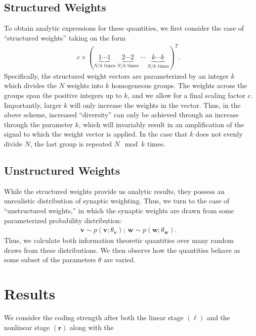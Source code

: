\documentclass[11pt]{article}
\begin{document}
	\subsection{Structured Weights}
	To obtain analytic expressions for these quantities, we first consider the case of ``structured weights'' taking on the form
	\begin{align}
		c \times \left(\underbrace{1 \cdots 1}_{N/k \text{ times}}  \ \underbrace{2 \cdots 2}_{N/k \text{ times}} \ \cdots \ \underbrace{k \cdots k}_{N/k \text{ times}}   \right)^T.
	\end{align}
	Specifically, the structured weight vectors are parameterized by an integer $k$ which divides the $N$ weights into $k$ homogeneous groups. The weights across the groups span the positive integers up to $k$, and we allow for a final scaling factor $c$. Importantly,  larger $k$ will only increase the weights in the vector. Thus, in the above scheme, increased ``diversity'' can only be achieved through an increase through the parameter $k$, which will invariably result in an amplification of the signal to which the weight vector is applied. In the case that $k$ does not evenly divide $N$, the last group is repeated $N\mod k$ times.
	
	\subsection{Unstructured Weights}
	
	While the structured weights provide us analytic results, they possess an unrealistic distribution of synaptic weighting. Thus, we turn to the case of ``unstructured weights,'' in which the synaptic weights are drawn from some parameterized probability distribution:
	\begin{align}
		\mathbf{v} \sim p(\mathbf{v}; \theta_{\mathbf{v}}); \ \mathbf{w} \sim p(\mathbf{w}; \theta_{\mathbf{w}}).
	\end{align}
	Thus, we  calculate both information theoretic quantities over many random draws from these distributions. We then observe how the quantities behave as some subset of the parameters $\theta$ are varied.
	\newpage
	
	\section{Results}
	We consider the coding strength after both the linear stage $(\boldsymbol{\ell})$ and the nonlinear stage $(\mathbf{r})$ along with the 
\end{document}
